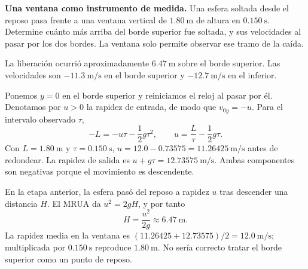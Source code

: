 \nivelavanzado

\begin{ejercicio}
\textbf{Una ventana como instrumento de medida.} Una esfera soltada desde el reposo pasa frente a una ventana vertical de \(\SI{1.80}{\meter}\) de altura en \(\SI{0.150}{\second}\). Determine cuánto más arriba del borde superior fue soltada, y sus velocidades al pasar por los dos bordes. La ventana solo permite observar ese tramo de la caída.
\end{ejercicio}
\begin{respuesta}
La liberación ocurrió aproximadamente \(\SI{6.47}{\meter}\) sobre el borde superior. Las velocidades son \(-\SI{11.3}{\meter\per\second}\) en el borde superior y \(-\SI{12.7}{\meter\per\second}\) en el inferior.
\end{respuesta}
\begin{explicacion}
Ponemos \(y=0\) en el borde superior y reiniciamos el reloj al pasar por él. Denotamos por \(u>0\) la rapidez de entrada, de modo que \(v_{0y}=-u\). Para el intervalo observado \(\tau\),
\[ -L=-u\tau-\frac12g\tau^2,\qquad u=\frac{L}{\tau}-\frac12g\tau. \]
Con \(L=\SI{1.80}{\meter}\) y \(\tau=\SI{0.150}{\second}\), \(u=12.0-0.73575=\SI{11.26425}{\meter\per\second}\) antes de redondear. La rapidez de salida es \(u+g\tau=\SI{12.73575}{\meter\per\second}\). Ambas componentes son negativas porque el movimiento es descendente.

En la etapa anterior, la esfera pasó del reposo a rapidez \(u\) tras descender una distancia \(H\). El MRUA da \(u^2=2gH\), y por tanto
\[ H=\frac{u^2}{2g}\approx\SI{6.47}{\meter}. \]
La rapidez media en la ventana es \((11.26425+12.73575)/2=\SI{12.0}{\meter\per\second}\); multiplicada por \(\SI{0.150}{\second}\) reproduce \(\SI{1.80}{\meter}\). No sería correcto tratar el borde superior como un punto de reposo.
\end{explicacion}


